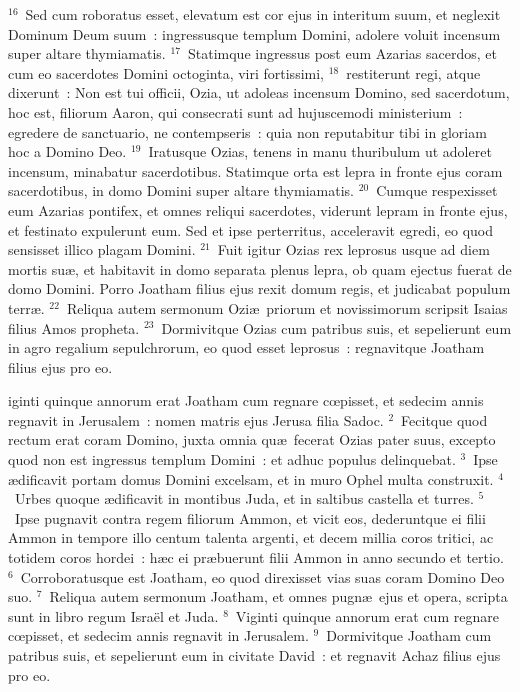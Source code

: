 ${}^{16}$~Sed cum roboratus esset, elevatum est cor ejus in interitum suum, et neglexit Dominum Deum suum~: ingressusque templum Domini, adolere voluit incensum super altare thymiamatis.
${}^{17}$~Statimque ingressus post eum Azarias sacerdos, et cum eo sacerdotes Domini octoginta, viri fortissimi,
${}^{18}$~restiterunt regi, atque dixerunt~: Non est tui officii, Ozia, ut adoleas incensum Domino, sed sacerdotum, hoc est, filiorum Aaron, qui consecrati sunt ad hujuscemodi ministerium~: egredere de sanctuario, ne contempseris~: quia non reputabitur tibi in gloriam hoc a Domino Deo.
${}^{19}$~Iratusque Ozias, tenens in manu thuribulum ut adoleret incensum, minabatur sacerdotibus. Statimque orta est lepra in fronte ejus coram sacerdotibus, in domo Domini super altare thymiamatis.
${}^{20}$~Cumque respexisset eum Azarias pontifex, et omnes reliqui sacerdotes, viderunt lepram in fronte ejus, et festinato expulerunt eum. Sed et ipse perterritus, acceleravit egredi, eo quod sensisset illico plagam Domini.
${}^{21}$~Fuit igitur Ozias rex leprosus usque ad diem mortis su\ae , et habitavit in domo separata plenus lepra, ob quam ejectus fuerat de domo Domini. Porro Joatham filius ejus rexit domum regis, et judicabat populum terr\ae .
${}^{22}$~Reliqua autem sermonum Ozi\ae\ priorum et novissimorum scripsit Isaias filius Amos propheta.
${}^{23}$~Dormivitque Ozias cum patribus suis, et sepelierunt eum in agro regalium sepulchrorum, eo quod esset leprosus~: regnavitque Joatham filius ejus pro eo.

\bchapter
{}iginti quinque annorum erat Joatham cum regnare cœpisset, et sedecim annis regnavit in Jerusalem~: nomen matris ejus Jerusa filia Sadoc.
${}^{2}$~Fecitque quod rectum erat coram Domino, juxta omnia qu\ae\ fecerat Ozias pater suus, excepto quod non est ingressus templum Domini~: et adhuc populus delinquebat.
${}^{3}$~Ipse \ae dificavit portam domus Domini excelsam, et in muro Ophel multa construxit.
${}^{4}$~Urbes quoque \ae dificavit in montibus Juda, et in saltibus castella et turres.
${}^{5}$~Ipse pugnavit contra regem filiorum Ammon, et vicit eos, dederuntque ei filii Ammon in tempore illo centum talenta argenti, et decem millia coros tritici, ac totidem coros hordei~: h\ae c ei pr\ae buerunt filii Ammon in anno secundo et tertio.
${}^{6}$~Corroboratusque est Joatham, eo quod direxisset vias suas coram Domino Deo suo.
${}^{7}$~Reliqua autem sermonum Joatham, et omnes pugn\ae\ ejus et opera, scripta sunt in libro regum Isra\"el et Juda.
${}^{8}$~Viginti quinque annorum erat cum regnare cœpisset, et sedecim annis regnavit in Jerusalem.
${}^{9}$~Dormivitque Joatham cum patribus suis, et sepelierunt eum in civitate David~: et regnavit Achaz filius ejus pro eo.


